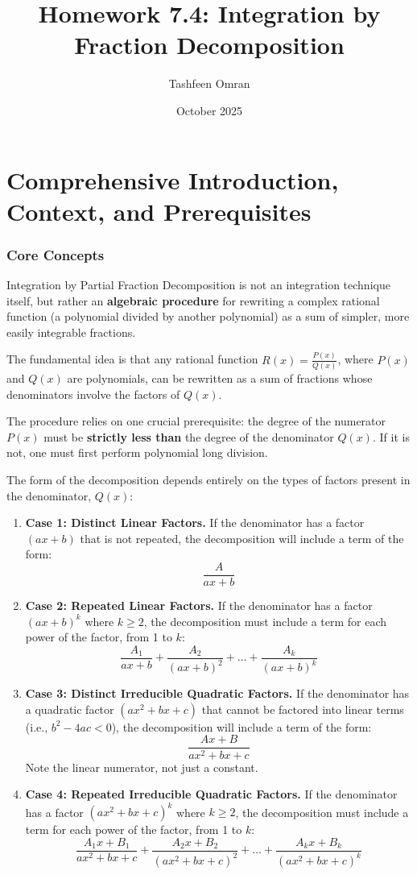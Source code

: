 \documentclass{article}
\title{Homework 7.4: Integration by Fraction Decomposition}
\author{Tashfeen Omran}
\date{October 2025}
\begin{document}
\maketitle

\part{Comprehensive Introduction, Context, and Prerequisites}

\section{Core Concepts}
Integration by Partial Fraction Decomposition is not an integration technique itself, but rather an \textbf{algebraic procedure} for rewriting a complex rational function (a polynomial divided by another polynomial) as a sum of simpler, more easily integrable fractions.

The fundamental idea is that any rational function $R(x) = \frac{P(x)}{Q(x)}$, where $P(x)$ and $Q(x)$ are polynomials, can be rewritten as a sum of fractions whose denominators involve the factors of $Q(x)$.

The procedure relies on one crucial prerequisite: the degree of the numerator $P(x)$ must be \textbf{strictly less than} the degree of the denominator $Q(x)$. If it is not, one must first perform polynomial long division.

The form of the decomposition depends entirely on the types of factors present in the denominator, $Q(x)$:

\begin{enumerate}
    \item \textbf{Case 1: Distinct Linear Factors.} If the denominator has a factor $(ax+b)$ that is not repeated, the decomposition will include a term of the form:
    \[ \frac{A}{ax+b} \]
    \item \textbf{Case 2: Repeated Linear Factors.} If the denominator has a factor $(ax+b)^k$ where $k \ge 2$, the decomposition must include a term for each power of the factor, from 1 to $k$:
    \[ \frac{A_1}{ax+b} + \frac{A_2}{(ax+b)^2} + \dots + \frac{A_k}{(ax+b)^k} \]
    \item \textbf{Case 3: Distinct Irreducible Quadratic Factors.} If the denominator has a quadratic factor $(ax^2+bx+c)$ that cannot be factored into linear terms (i.e., $b^2-4ac < 0$), the decomposition will include a term of the form:
    \[ \frac{Ax+B}{ax^2+bx+c} \]
    Note the linear numerator, not just a constant.
    \item \textbf{Case 4: Repeated Irreducible Quadratic Factors.} If the denominator has a factor $(ax^2+bx+c)^k$ where $k \ge 2$, the decomposition must include a term for each power of the factor, from 1 to $k$:
    \[ \frac{A_1x+B_1}{ax^2+bx+c} + \frac{A_2x+B_2}{(ax^2+bx+c)^2} + \dots + \frac{A_kx+B_k}{(ax^2+bx+c)^k} \]
\end{enumerate}
\end{document}
